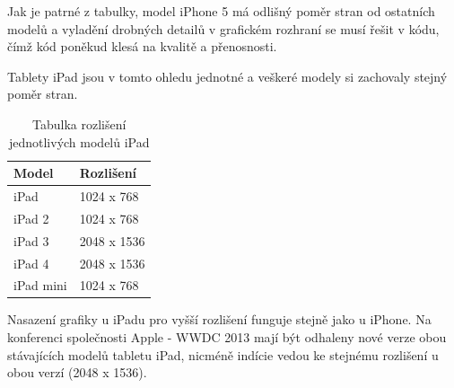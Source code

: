 Jak je patrné z tabulky, model iPhone 5 má odlišný poměr stran od ostatních modelů a vyladění drobných detailů v grafickém rozhraní se musí řešit v kódu, čímž kód poněkud klesá na kvalitě a přenosnosti.

\newpage
Tablety iPad jsou v tomto ohledu jednotné a veškeré modely si zachovaly stejný poměr stran.

\begin{table}[h]
	\begin{center}
		\begin{tabular}{|l|l|}
			\hline
				{\bf Model} & {\bf Rozlišení}\\
			\hline \hline
				iPad & 1024 x 768\\
				\hline
				iPad 2 & 1024 x 768\\
				\hline
				iPad 3 & 2048 x 1536\\
				\hline
				iPad 4 & 2048 x 1536\\
				\hline
				iPad mini & 1024 x 768\\
				\hline
		\end{tabular}
	\end{center}
	\caption{Tabulka rozlišení jednotlivých modelů iPad}
	\label{tab.restab}
\end{table}

Nasazení grafiky u iPadu pro vyšší rozlišení funguje stejně jako u iPhone. Na konferenci společnosti Apple - WWDC 2013 mají být odhaleny nové verze obou stávajících modelů tabletu iPad, nicméně indície vedou ke stejnému rozlišení u obou verzí (2048 x 1536).
